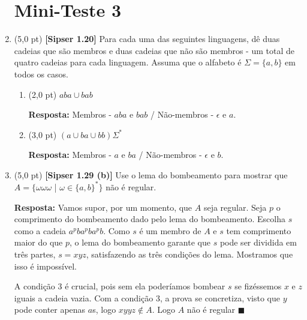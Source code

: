 \documentclass[12pt,a4paper,oneside]{article}
\begin{document}
\begin{enumerate}
	
	\section*{Mini-Teste 3}
	
	\item (5,0 pt) {\bf [Sipser 1.20]} Para cada uma das seguintes linguagens, dê duas cadeias que são membros e duas cadeias que não são membros - um total de quatro cadeias para cada linguagem. Assuma que o alfabeto é $\Sigma = \{a,b\}$ em todos os casos.
	\begin{enumerate}
		\item (2,0 pt) $aba \cup bab$ 
		
		\vspace*{0.3cm}
		
		{\color{blue} {\bf Resposta:} Membros - $aba$ e $bab$ / Não-membros - $\epsilon$ e $a$.}
		
		\item (3,0 pt) $(a \cup ba \cup bb)\Sigma^*$
		
		\vspace*{0.3cm}
		
		{\color{blue} {\bf Resposta:} Membros - $a$ e $ba$ / Não-membros - $\epsilon$ e $b$.}
	\end{enumerate}
	
	\item (5,0 pt) {\bf [Sipser 1.29 (b)]} Use o lema do bombeamento para mostrar que $A = \{\omega \omega \omega$ | $\omega \in \{a, b\}^* \}$ não é regular.
	
	\vspace*{0.3cm}
	
	{\color{blue} {\bf Resposta:} Vamos supor, por um momento, que $A$ seja regular. Seja $p$ o comprimento do bombeamento dado pelo lema do bombeamento. Escolha $s$ como a cadeia $a^pba^pba^pb$. Como $s$ é um membro de $A$ e $s$ tem comprimento maior do que $p$, o lema do bombeamento garante que $s$ pode ser dividida em três partes, $s = xyz$, satisfazendo as três condições do lema. Mostramos que isso é impossível.
		
		A condição 3 é crucial, pois sem ela poderíamos bombear $s$ se fizéssemos $x$ e $z$ iguais a cadeia vazia. Com a condição 3, a prova se concretiza, visto que $y$ pode conter apenas $a$s, logo $xyyz \not\in A$. Logo $A$ não é regular $\blacksquare$
	
	}

\newpage


\end{enumerate}
\end{document}

